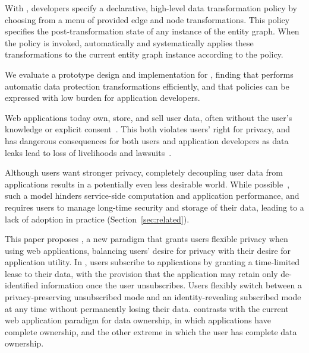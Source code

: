 With \sys, developers specify a declarative, high-level data transformation policy by choosing from
a menu of provided edge and node transformations. This policy specifies the post-transformation
state of any instance of the entity graph. When the policy is invoked, \sys automatically and
systematically applies these transformations to the current entity graph instance according to the
policy.

We evaluate a prototype design and implementation for \sys, finding that \sys performs automatic
data protection transformations efficiently, and that policies can be expressed with low burden for
application developers.

\iffalse
%
%
Web applications today own, store, and sell user data, often without the user's knowledge or
explicit consent~\cite{nytimes:fb, npr:data}. This both violates users' right for privacy, and has
dangerous consequences for both users and application developers as data leaks lead to loss of
livelihoods and lawsuits~\cite{breach:amazon,breach:twitter, breach:fb, breach:marriott,
breach:quora}. 

Although users want stronger privacy, completely decoupling user data from applications results in a
potentially even less desirable world. While possible~\cite{solid, amber, w5, blockstack, bstore}, such a
model hinders service-side computation and application performance, and requires users to manage
long-time security and storage of their data, leading to a lack of adoption in practice (Section~\ref{sec:related}).  

This paper proposes \name, a new paradigm that grants users flexible privacy when using web
applications, balancing users' desire for privacy with their desire for application utility. In
\name, users subscribe to applications by granting a time-limited lease to their data, with the
provision that the application may retain only de-identified information once the user unsubscribes.
Users flexibly switch between a privacy-preserving unsubscribed mode and an identity-revealing
subscribed mode at any time without permanently losing their data. \name contrasts
with the current web application paradigm for data ownership, in which applications have complete
ownership, and the other extreme in which the user has complete data ownership.%

